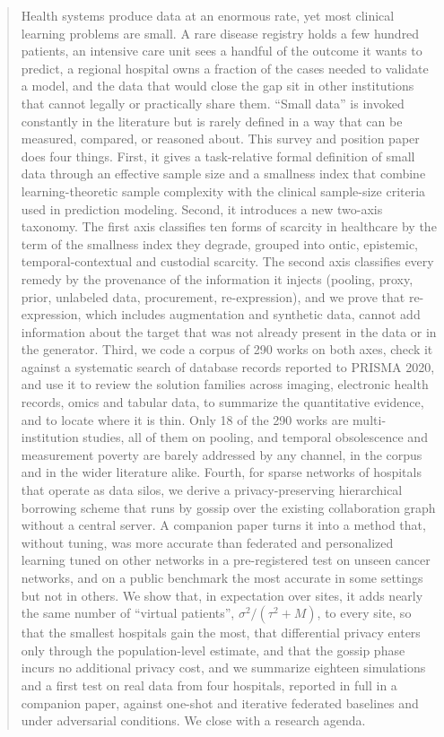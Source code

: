 \documentclass[acmsmall,screen,review]{acmart}
\theoremstyle{acmdefinition}
\begin{document}
\begin{abstract}
Health systems produce data at an enormous rate, yet most clinical learning problems are small. A rare disease registry holds a few hundred patients, an intensive care unit sees a handful of the outcome it wants to predict, a regional hospital owns a fraction of the cases needed to validate a model, and the data that would close the gap sit in other institutions that cannot legally or practically share them. ``Small data'' is invoked constantly in the literature but is rarely defined in a way that can be measured, compared, or reasoned about. This survey and position paper does four things. First, it gives a task-relative formal definition of small data through an effective sample size and a smallness index that combine learning-theoretic sample complexity with the clinical sample-size criteria used in prediction modeling. Second, it introduces a new two-axis taxonomy. The first axis classifies ten forms of scarcity in healthcare by the term of the smallness index they degrade, grouped into ontic, epistemic, temporal-contextual and custodial scarcity. The second axis classifies every remedy by the provenance of the information it injects (pooling, proxy, prior, unlabeled data, procurement, re-expression), and we prove that re-expression, which includes augmentation and synthetic data, cannot add information about the target that was not already present in the data or in the generator. Third, we code a corpus of 290 works on both axes, check it against a systematic search of \PrismaEligible{} database records reported to PRISMA 2020, and use it to review the solution families across imaging, electronic health records, omics and tabular data, to summarize the quantitative evidence, and to locate where it is thin. Only 18 of the 290 works are multi-institution studies, all of them on pooling, and temporal obsolescence and measurement poverty are barely addressed by any channel, in the corpus and in the wider literature alike. Fourth, for sparse networks of hospitals that operate as data silos, we derive a privacy-preserving hierarchical borrowing scheme that runs by gossip over the existing collaboration graph without a central server. A companion paper turns it into a method that, without tuning, was more accurate than federated and personalized learning tuned on other networks in a pre-registered test on unseen cancer networks, and on a public benchmark the most accurate in some settings but not in others. We show that, in expectation over sites, it adds nearly the same number of ``virtual patients'', $\sigma^2/(\tau^2+M)$, to every site, so that the smallest hospitals gain the most, that differential privacy enters only through the population-level estimate, and that the gossip phase incurs no additional privacy cost, and we summarize eighteen simulations and a first test on real data from four hospitals, reported in full in a companion paper, against one-shot and iterative federated baselines and under adversarial conditions. We close with a research agenda.
\end{abstract}
\end{document}
